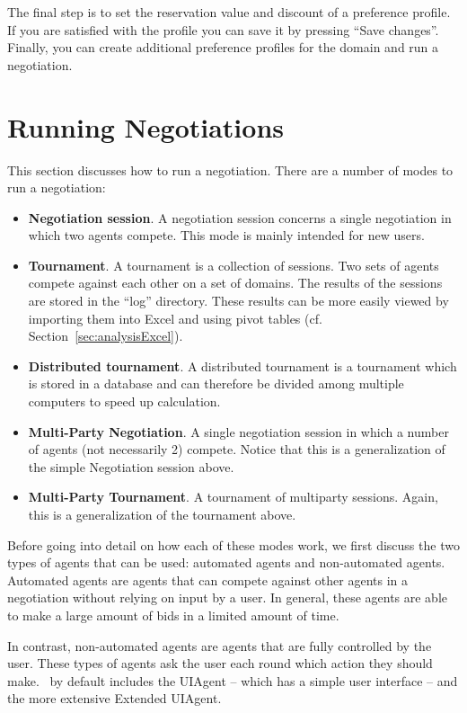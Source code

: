 \documentclass[]{article}
\begin{document}
The final step is to set the reservation value and discount of a preference profile. If you are satisfied with the profile you can save it by pressing ``Save changes''. Finally, you can create additional preference profiles for the domain and run a negotiation.

\section{Running Negotiations}
This section discusses how to run a negotiation. There are a number of modes to run a negotiation:

\begin{itemize}
	\item \textbf{Negotiation session}. A negotiation session concerns a single negotiation in which two agents compete. This mode is mainly intended for new users.
	\item \textbf{Tournament}. A tournament is a collection of sessions. Two sets of agents compete against each other on a set of domains. The results of the sessions are stored in the ``log'' directory. These results can be more easily viewed by importing them into Excel and using pivot tables (cf. Section~\ref{sec:analysisExcel}).
	\item \textbf{Distributed tournament}. A distributed tournament is a tournament which is stored in a database and can therefore be divided among multiple computers to speed up calculation.
	\item \textbf{Multi-Party Negotiation}. A single negotiation session in which a number of agents (not necessarily 2) compete. Notice that this is a generalization of the simple Negotiation session above.
	\item \textbf{Multi-Party Tournament}. A tournament of multiparty sessions. Again, this is a generalization of the tournament above.
	
\end{itemize}

Before going into detail on how each of these modes work, we first discuss the two types of agents that can be used: automated agents and non-automated agents. Automated agents are agents that can compete against other agents in a negotiation without relying on input by a user. In general, these agents are able to make a large amount of bids in a limited amount of time.

In contrast, non-automated agents are agents that are fully controlled by the user. These types of agents ask the user each round which action they should make. \Genius~by default includes the UIAgent -- which has a simple user interface -- and the more extensive Extended UIAgent.
\end{document}

